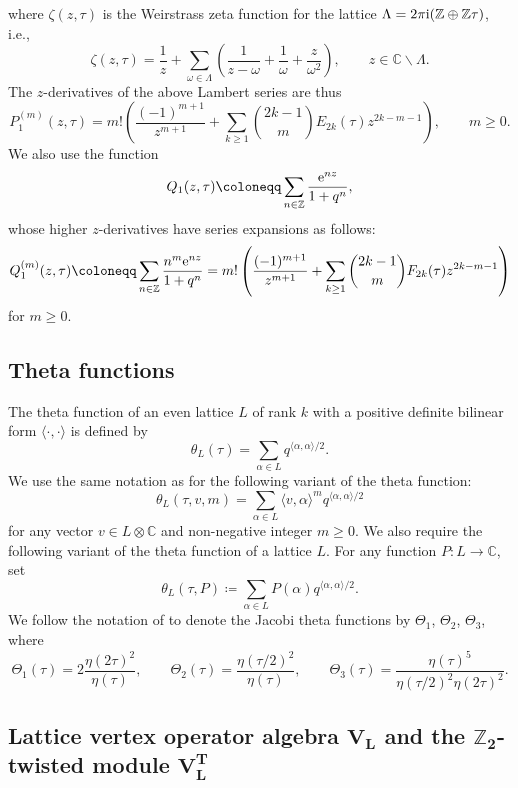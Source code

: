 \documentclass[pdftex]{sigma}
\numberwithin{equation}{section}
\theoremstyle{definition}
\begin{document}
where $\zeta(z,\tau)$ is the Weirstrass zeta function for the lattice $\Lambda=2\pi{\rm i}(\mathbb{Z}\oplus\mathbb{Z}\tau)$, i.e.,
\[\zeta(z,\tau)=\frac{1}{z}+\sum_{\omega\in \Lambda}\left(\frac{1}{z-\omega}+\frac{1}{\omega}+\frac{z}{\omega^2} \right),\qquad z\in \mathbb{C}\backslash \Lambda.\]
The $z$-derivatives of the above Lambert series are thus
\[P_1^{(m)}(z,\tau)=m!\left( \frac{(-1)^{m+1}}{z^{m+1}}+\sum_{k\geq 1}\binom{2k-1}{m}E_{2k}(\tau)z^{2k-m-1} \right),\qquad m\geq 0.\]
We also use the function
\[Q_1(z,\tau)\coloneqq \sum_{n\in \mathbb{Z}}\frac{{\rm e}^{nz}}{1+q^n},\]
whose higher $z$-derivatives have series expansions as follows:
\begin{gather}
 Q_1^{(m)}(z,\tau)\coloneqq \sum_{n\in \mathbb{Z}}\frac{n^m{\rm e}^{nz}}{1+q^n}=m!\left( \frac{(-1)^{m+1}}{z^{m+1}}+\sum_{k\geq 1}\binom{2k-1}{m}F_{2k}(\tau)z^{2k-m-1} \right)\label{eq 10 from MM}
\end{gather}
 for $m\geq 0$.

\subsection{Theta functions}

The theta function of an even lattice $L$ of rank $k$ with a positive definite bilinear form $\langle \cdot,\cdot\rangle$ is defined by
\[\theta_L(\tau)=\sum_{\alpha\in L}q^{\langle\alpha,\alpha\rangle/2}.\]
We use the same notation as \cite{Mason20231-PointAlgebras} for the following variant of the theta function:
\[\theta_L(\tau,v,m)=\sum_{\alpha\in L}\langle v,\alpha\rangle^mq^{\langle\alpha,\alpha\rangle/2}\]
for any vector $v\in L\otimes\mathbb{C}$ and non-negative integer $m\geq 0$. We also require the following variant of the theta function of a lattice $L$. For any function $P\colon L\to \mathbb{C}$, set
\[\theta_L(\tau,P)\coloneqq \sum_{\alpha\in L}P(\alpha)q^{\langle\alpha,\alpha\rangle/2}.\]
We follow the notation of \cite{Dong2000MonstrousWeight} to denote the Jacobi theta functions by $\Theta_1$, $\Theta_2$, $\Theta_3$, where
\[\Theta_1(\tau)=2\frac{\eta(2\tau)^2}{\eta(\tau)}, \qquad \Theta_2(\tau)=\frac{\eta(\tau/2)^2}{\eta(\tau)},\qquad \Theta_3(\tau)=\frac{\eta(\tau)^5}{\eta(\tau/2)^2\eta(2\tau)^2}.\]

\subsection[Lattice vertex operator algebra V\_L and the Z\_2-twisted module V\_L^T]{Lattice vertex operator algebra $\boldsymbol{V_L}$ and the $\boldsymbol{\mathbb{Z}_2}$-twisted module $\boldsymbol{V_L^T}$}\label{sec2.3}
\end{document}
